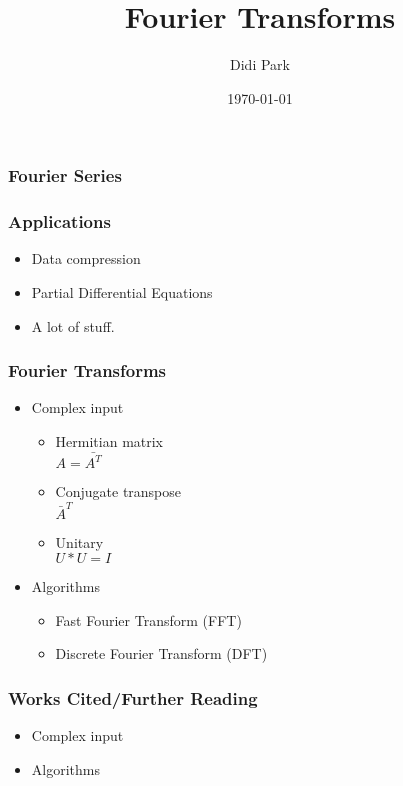 \documentclass{beamer}
\title{Fourier Transforms}
\author{Didi Park}
\date{\today}
\begin{document}
\frame{\titlepage}


\frame
{
  \frametitle{Fourier Series}

}
\frame
{
  \frametitle{Applications}

  \begin{itemize}
  \item<1-> Data compression
  \item<2-> Partial Differential Equations
  \item<3-> A lot of stuff.   
  \end{itemize}
}
\frame
{
  \frametitle{Fourier Transforms}

  \begin{itemize}
  \item<1-> Complex input
  	\begin{itemize}
		\item Hermitian matrix\\
		$A=\bar{A^T}$
		\item Conjugate transpose\\
		$\bar{A}^T$
		\item Unitary\\
		$U*U=I$
	\end{itemize}
  \item<2-> Algorithms
  	\begin{itemize}
		\item Fast Fourier Transform (FFT)
		\item Discrete Fourier Transform (DFT)
	\end{itemize}
 \end{itemize}
}
\frame
{
  \frametitle{Works Cited/Further Reading}

  \begin{itemize}
  \item<1-> Complex input
   \item<2-> Algorithms
 \end{itemize}
}
\end{document}
